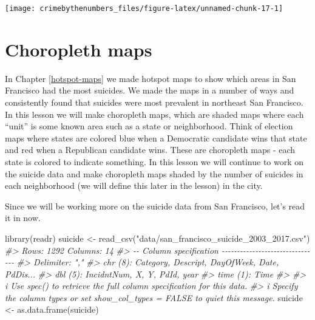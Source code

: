 \documentclass[
]{krantz}
\makeatletter
\newenvironment{Shaded}{\begin{snugshade}}{\end{snugshade}}
\newcommand{\CommentTok}[1]{\textcolor[rgb]{0.37,0.37,0.37}{\textit{#1}}}
\newcommand{\FunctionTok}[1]{\textcolor[rgb]{0,0,0}{#1}}
\newcommand{\NormalTok}[1]{#1}
\newcommand{\OtherTok}[1]{\textcolor[rgb]{0.37,0.37,0.37}{#1}}
\newcommand{\StringTok}[1]{\textcolor[rgb]{0.5,0.5,0.5}{#1}}
\newenvironment{kframe}{%
\medskip{}
\setlength{\fboxsep}{.8em}
 \def\at@end@of@kframe{}%
 \ifinner\ifhmode%
  \def\at@end@of@kframe{\end{minipage}}%
  \begin{minipage}{\columnwidth}%
 \fi\fi%
 \def\FrameCommand##1{\hskip\@totalleftmargin \hskip-\fboxsep
 \colorbox{shadecolor}{##1}\hskip-\fboxsep
     \hskip-\linewidth \hskip-\@totalleftmargin \hskip\columnwidth}%
 \MakeFramed {\advance\hsize-\width
   \@totalleftmargin\z@ \linewidth\hsize
   \@setminipage}}%
 {\par\unskip\endMakeFramed%
 \at@end@of@kframe}
\renewenvironment{Shaded}{\begin{kframe}}{\end{kframe}}
\makeatother
\begin{document}
\begin{center}\texttt{[image: crimebythenumbers\_files/figure-latex/unnamed-chunk-17-1]} \end{center}

\hypertarget{choropleth-maps}{%
\chapter{Choropleth maps}\label{choropleth-maps}}

In Chapter \ref{hotspot-maps} we made hotspot maps to show which areas in San Francisco had the most suicides. We made the maps in a number of ways and consistently found that suicides were most prevalent in northeast San Francisco. In this lesson we will make choropleth maps, which are shaded maps where each ``unit'' is some known area such as a state or neighborhood. Think of election maps where states are colored blue when a Democratic candidate wins that state and red when a Republican candidate wins. These are choropleth maps - each state is colored to indicate something. In this lesson we will continue to work on the suicide data and make choropleth maps shaded by the number of suicides in each neighborhood (we will define this later in the lesson) in the city.

Since we will be working more on the suicide data from San Francisco, let's read it in now.

\begin{Shaded}
\begin{Highlighting}[]
\FunctionTok{library}\NormalTok{(readr)}
\NormalTok{suicide }\OtherTok{\textless{}{-}} \FunctionTok{read\_csv}\NormalTok{(}\StringTok{"data/san\_francisco\_suicide\_2003\_2017.csv"}\NormalTok{)}
\CommentTok{\#\textgreater{} Rows: 1292 Columns: 14}
\CommentTok{\#\textgreater{} {-}{-} Column specification {-}{-}{-}{-}{-}{-}{-}{-}{-}{-}{-}{-}{-}{-}{-}{-}{-}{-}{-}{-}{-}{-}{-}{-}{-}{-}{-}{-}{-}{-}{-}{-}}
\CommentTok{\#\textgreater{} Delimiter: ","}
\CommentTok{\#\textgreater{} chr  (8): Category, Descript, DayOfWeek, Date, PdDis...}
\CommentTok{\#\textgreater{} dbl  (5): IncidntNum, X, Y, PdId, year}
\CommentTok{\#\textgreater{} time (1): Time}
\CommentTok{\#\textgreater{} }
\CommentTok{\#\textgreater{} i Use \textasciigrave{}spec()\textasciigrave{} to retrieve the full column specification for this data.}
\CommentTok{\#\textgreater{} i Specify the column types or set \textasciigrave{}show\_col\_types = FALSE\textasciigrave{} to quiet this message.}
\NormalTok{suicide }\OtherTok{\textless{}{-}} \FunctionTok{as.data.frame}\NormalTok{(suicide)}
\end{Highlighting}
\end{Shaded}
\end{document}
